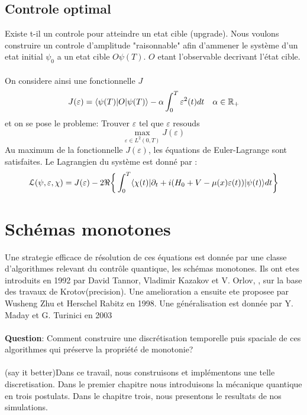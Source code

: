 \subsection*{Controle optimal}
Existe t-il un controle pour atteindre un etat cible (upgrade).
Nous voulons construire un controle d'amplitude "raisonnable" afin d'ammener le système d'un etat initial $\psi_0$ a un etat cible $O\psi(T)$. $O$ etant l'observable decrivant l'état cible.\\\\
On considere ainsi une fonctionnelle $J$
\begin{equation}
J(\varepsilon) = \langle \psi(T)|O|\psi(T) \rangle - \alpha \int_{0}^{T}\varepsilon^2(t)dt \quad \alpha \in \mathbb R_+
\end{equation}
et on se pose le probleme: Trouver $\varepsilon$ tel que $\varepsilon$ resouds
$$ \max_{\varepsilon \in L^2(0,T)} J(\varepsilon)$$
Au maximum de la fonctionnelle $J(\varepsilon)$, les équations de Euler-Lagrange sont satisfaites. Le Lagrangien du système est donné par :
\begin{equation} \label{lagrangien}
\mathcal{L}(\psi,\varepsilon,\chi)= J(\varepsilon)\\
-2\Re \bigg\{ \int_{0}^{T}\langle \chi (t)|\partial_{t}+i(H_0+V-\mu(x)\varepsilon(t))|\psi(t) \rangle dt \bigg\}
\end{equation}
\section*{Schémas monotones}
Une strategie efficace de résolution de ces équations est donnée par une classe d’algorithmes relevant du contrôle quantique, les schémas monotones. Ils ont etes introduits en 1992 par David Tannor, Vladimir Kazakov et V. Orlov,  \cite{Tannor}, sur la base des travaux de Krotov(precision). Une amelioration a ensuite ete proposee par Wusheng Zhu et Herschel Rabitz \cite{Zhu} en 1998. Une généralisation est donnée par Y. Maday et G. Turinici en 2003 \cite{Maday}\\\\
\textbf{Question}: Comment construire une discrétisation temporelle puis spaciale de ces algorithmes qui préserve la propriété de monotonie?\\\\
(say it better)Dans ce travail, nous construisons et implémentons une telle discretisation.
Dans le premier chapitre nous introduisons la mécanique quantique en trois postulats.
Dans le chapitre trois, nous presentons le resultats de nos simulations.


